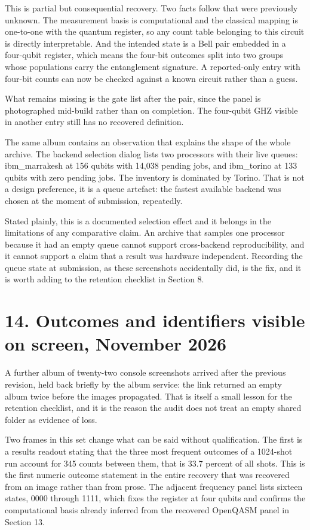 \documentclass[11pt]{article}
\begin{document}
This is partial but consequential recovery. Two facts follow that were previously unknown. The measurement basis is computational and the classical mapping is one-to-one with the quantum register, so any count table belonging to this circuit is directly interpretable. And the intended state is a Bell pair embedded in a four-qubit register, which means the four-bit outcomes split into two groups whose populations carry the entanglement signature. A reported-only entry with four-bit counts can now be checked against a known circuit rather than a guess.

What remains missing is the gate list after the pair, since the panel is photographed mid-build rather than on completion. The four-qubit GHZ visible in another entry still has no recovered definition.

The same album contains an observation that explains the shape of the whole archive. The backend selection dialog lists two processors with their live queues: ibm_marrakesh at 156 qubits with 14,038 pending jobs, and ibm_torino at 133 qubits with zero pending jobs. The inventory is dominated by Torino. That is not a design preference, it is a queue artefact: the fastest available backend was chosen at the moment of submission, repeatedly.

Stated plainly, this is a documented selection effect and it belongs in the limitations of any comparative claim. An archive that samples one processor because it had an empty queue cannot support cross-backend reproducibility, and it cannot support a claim that a result was hardware independent. Recording the queue state at submission, as these screenshots accidentally did, is the fix, and it is worth adding to the retention checklist in Section 8.

\section*{14. Outcomes and identifiers visible on screen, November 2026}

A further album of twenty-two console screenshots arrived after the previous revision, held back briefly by the album service: the link returned an empty album twice before the images propagated. That is itself a small lesson for the retention checklist, and it is the reason the audit does not treat an empty shared folder as evidence of loss.

Two frames in this set change what can be said without qualification. The first is a results readout stating that the three most frequent outcomes of a 1024-shot run account for 345 counts between them, that is 33.7 percent of all shots. This is the first numeric outcome statement in the entire recovery that was recovered from an image rather than from prose. The adjacent frequency panel lists sixteen states, 0000 through 1111, which fixes the register at four qubits and confirms the computational basis already inferred from the recovered OpenQASM panel in Section 13.
\end{document}
